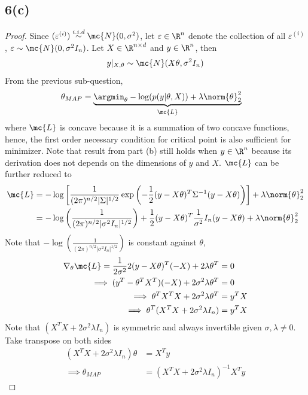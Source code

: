 \documentclass[11pt]{article}
\newcommand{\upi}[0]{^{(i)}}
\begin{document}
	\subsection{6(c)}
	\begin{proof}
		Since $(\varepsilon\upi) \overset{i.i.d}{\sim} \mc{N}(0, \sigma^2)$, let $\varepsilon \in \R^n$ denote the collection of all $\varepsilon\upi$, $\varepsilon \sim \mc{N}(0, \sigma^2 I_n)$. Let $X \in \R^{n \times d}$ and $y \in \R^n$, then 
		\begin{align}
			y|_{X, \theta} \sim \mc{N}(X \theta, \sigma^2 I_n)
		\end{align}
		From the previous sub-question,
		\begin{align}
			\theta_{MAP} &= \underbrace{\argmin_\theta - \log(p(y|\theta, X)) + \lambda \norm{\theta}_2^2}_{\mc{L}}
		\end{align}
		where $\mc{L}$ is concave because it is a summation of two concave functions, hence, the first order necessary condition for critical point is also sufficient for minimizer. Note that result from part (b) still holds when $y \in \R^n$ because its derivation does not depends on the dimensions of $y$ and $X$. $\mc{L}$ can be further reduced to
		\begin{align}
			\mc{L} &= - \log \left [
			\frac{1}{(2\pi)^{n/2} |\Sigma|^{1/2}} \exp \left (
			- \frac{1}{2} (y - X \theta)^T \Sigma^{-1} (y - X \theta)
			\right )
			\right] + \lambda \norm{\theta}_2^2 \\
			&= - \log \left (
			\frac{1}{(2\pi)^{n/2} |\sigma^2 I_n|^{1/2}}
			\right )
			+ \frac{1}{2} (y - X \theta)^T \frac{1}{\sigma^2} I_n (y - X \theta) 
			+ \lambda \norm{\theta}_2^2
		\end{align}
		Note that $- \log \left (
			\frac{1}{(2\pi)^{n/2} |\sigma^2 I_n|^{1/2}}
			\right )$ is constant against $\theta$, 
		\begin{align}
			\nabla_\theta \mc{L} = \frac{1}{2 \sigma^2} 2 (y - X\theta)^T (-X) + 2 \lambda \theta^T &= 0 \\
			\implies (y^T - \theta^T X^T)(-X) + 2 \sigma^2 \lambda \theta^T &= 0 \\
			\implies \theta^T X^TX + 2 \sigma^2 \lambda \theta^T&= y^T X \\
			\implies \theta^T (X^T X + 2 \sigma^2 \lambda I_n) &= y^T X
		\end{align}
		Note that $(X^T X + 2 \sigma^2 \lambda I_n)$ is symmetric and always invertible given $\sigma, \lambda \neq 0$. Take transpose on both sides
		\begin{align}
			(X^T X + 2 \sigma^2 \lambda I_n) \theta &= X^T y \\
			\implies \theta_{MAP} &= (X^T X + 2 \sigma^2 \lambda I_n)^{-1} X^T y
		\end{align}
	\end{proof}
	
\end{document}
